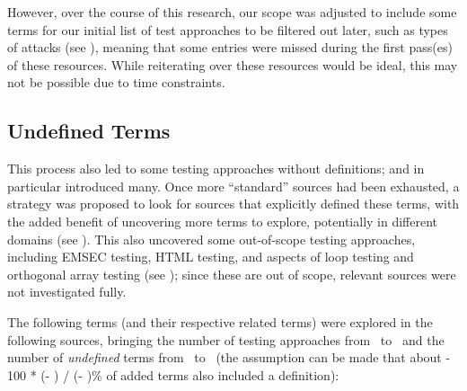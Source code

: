 However, over the course of this research, our scope was adjusted to include
some terms for our initial list of test approaches to be filtered out later,
such as types of attacks (see ), meaning that some entries
were missed during the first pass(es) of these resources. While reiterating
over these resources would be ideal, this may not be possible due to time
constraints.

\subsection{Undefined Terms}
\label{undef-terms}


\newcount\TotalBefore
\newcount\TotalAfter
\newcount\UndefBefore
\newcount\UndefAfter



This process also led to some testing approaches without definitions;
\citep{IEEE2022} and \citep{Firesmith2015} in particular introduced many.
Once more ``standard'' sources had been exhausted, a strategy was proposed to
look for sources that explicitly defined these terms, with the added benefit of
uncovering more terms to explore, potentially in different domains (see
). This also uncovered some out-of-scope testing approaches,
including EMSEC testing, HTML testing, and aspects of loop testing and
orthogonal array testing (see ); since these
are out of scope, relevant sources were not investigated fully.

The following terms (and their respective related terms)
were explored in the following sources, bringing the number of testing
approaches from \the\TotalBefore~to \the\TotalAfter~and the number of
\emph{undefined} terms from \the\UndefBefore~to \the\UndefAfter~(the assumption
can be made that about \the{} - 100 * (\UndefAfter - \UndefBefore) /
(\TotalAfter - \TotalBefore)\relax\% of added terms also included a definition):

